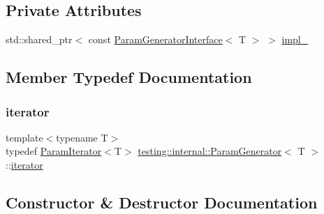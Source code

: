 \subsection*{Private Attributes}
\begin{DoxyCompactItemize}
\item 
std\+::shared\+\_\+ptr$<$ const \hyperlink{classtesting_1_1internal_1_1ParamGeneratorInterface}{Param\+Generator\+Interface}$<$ T $>$ $>$ \hyperlink{classtesting_1_1internal_1_1ParamGenerator_a2ea0b72d470d5a961272c2b818a3f78d}{impl\+\_\+}
\end{DoxyCompactItemize}


\subsection{Member Typedef Documentation}
\mbox{\label{classtesting_1_1internal_1_1ParamGenerator_a448b08a8eaae1f1d27840d4dbd66c357}} 
\subsubsection{\texorpdfstring{iterator}{iterator}}
{\footnotesize\ttfamily template$<$typename T$>$ \\
typedef \hyperlink{classtesting_1_1internal_1_1ParamIterator}{Param\+Iterator}$<$T$>$ \hyperlink{classtesting_1_1internal_1_1ParamGenerator}{testing\+::internal\+::\+Param\+Generator}$<$ T $>$\+::\hyperlink{classtesting_1_1internal_1_1ParamGenerator_a448b08a8eaae1f1d27840d4dbd66c357}{iterator}}



\subsection{Constructor \& Destructor Documentation}
\mbox{\label{classtesting_1_1internal_1_1ParamGenerator_a6b017d4d030927714d495ee95ae92fbc}} 
